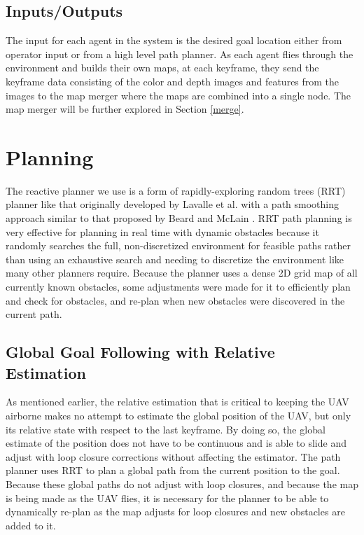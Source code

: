 \documentclass[letterpaper, 10 pt, conference]{ieeeconf}  %
\begin{document}
\subsection{Inputs/Outputs}

The input for each agent in the system is the desired goal location either from operator input or from a high level path planner. As each agent flies through the environment and builds their own maps, at each keyframe, they send the keyframe data consisting of the color and depth images and features from the images to the map merger where the maps are combined into a single node. The map merger will be further explored in Section \ref{merge}.

\section{Planning}\label{planning}

The reactive planner we use is a form of rapidly-exploring random trees (RRT) planner like that originally developed by Lavalle et al. \cite{Lavalle1998} with a path smoothing approach similar to that proposed by Beard and McLain \cite{Beard2012}. RRT path planning is very effective for planning in real time with dynamic obstacles because it randomly searches the full, non-discretized environment for feasible paths rather than using an exhaustive search and needing to discretize the environment like many other planners require. Because the planner uses a dense 2D grid map of all currently known obstacles, some adjustments were made for it to efficiently plan and check for obstacles, and re-plan when new obstacles were discovered in the current path.

\subsection{Global Goal Following with Relative Estimation}

As mentioned earlier, the relative estimation that is critical to keeping the UAV airborne makes no attempt to estimate the global position of the UAV, but only its relative state with respect to the last keyframe. By doing so, the global estimate of the position does not have to be continuous and is able to slide and adjust with loop closure corrections without affecting the estimator. The path planner uses RRT to plan a global path from the current position to the goal. Because these global paths do not adjust with loop closures, and because the map is being made as the UAV flies, it is necessary for the planner to be able to dynamically re-plan as the map adjusts for loop closures and new obstacles are added to it.
\end{document}
